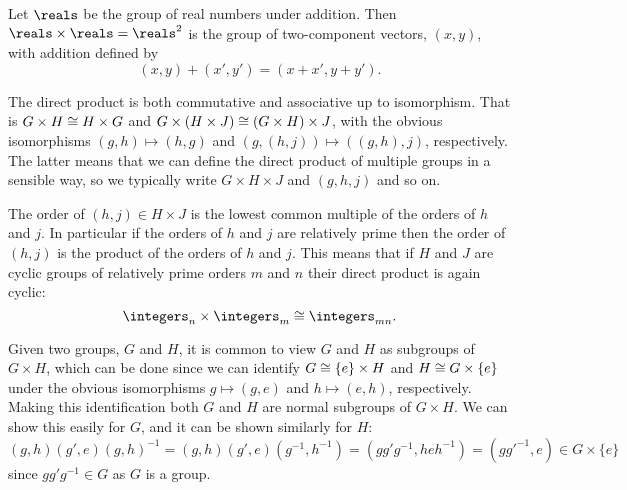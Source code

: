 \begin{exm}{}{}
    Let \(\reals\) be the group of real numbers under addition.
    Then \(\reals\times\reals = \reals^2\) is the group of two-component vectors, \((x, y)\), with addition defined by
    \begin{equation}
        (x, y) + (x', y') = (x + x', y + y').
    \end{equation}
\end{exm}

The direct product is both commutative and associative up to isomorphism.
That is \(G \times H \cong H \times G\) and \(G \times (H \times J) \cong (G \times H) \times J\), with the obvious isomorphisms \((g, h) \mapsto (h, g)\) and \((g, (h, j)) \mapsto ((g, h), j)\), respectively.
The latter means that we can define the direct product of multiple groups in a sensible way, so we typically write \(G \times H \times J\) and \((g, h, j)\) and so on.

The order of \((h, j) \in H \times J\) is the lowest common multiple of the orders of \(h\) and \(j\).
In particular if the orders of \(h\) and \(j\) are relatively prime then the order of \((h, j)\) is the product of the orders of \(h\) and \(j\).
This means that if \(H\) and \(J\) are cyclic groups of relatively prime orders \(m\) and \(n\) their direct product is again cyclic:
\begin{equation}
    \integers_{n} \times \integers_{m} \isomorphic \integers_{mn}.
\end{equation}

Given two groups, \(G\) and \(H\), it is common to view \(G\) and \(H\) as subgroups of \(G \times H\), which can be done since we can identify \(G \cong \{e\} \times H\) and \(H \cong G \times \{e\}\) under the obvious isomorphisms \(g \mapsto (g, e)\) and \(h \mapsto (e, h)\), respectively.
Making this identification both \(G\) and \(H\) are normal subgroups of \(G\times H\).
We can show this easily for \(G\), and it can be shown similarly for \(H\):
\begin{equation}
    (g, h)(g', e)(g, h)^{-1} = (g, h)(g', e)(g^{-1}, h^{-1}) = (gg'g^{-1}, heh^{-1}) = (gg'^{-1}, e) \in G \times \{e\}
\end{equation}
since \(gg'g^{-1} \in G\) as \(G\) is a group.

